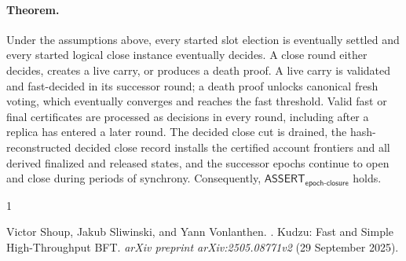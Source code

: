 \documentclass[sigplan,twocolumn,review,anonymous]{acmart}
\begin{document}
\paragraph{Theorem.}
Under the assumptions above, every started slot election is eventually settled and every started
logical close instance eventually decides.  A close round either decides, creates a live carry, or
produces a death proof.  A live carry is validated and fast-decided in its successor round; a death
proof unlocks canonical fresh voting, which eventually converges and reaches the fast threshold.
Valid fast or final certificates are processed as decisions in every round, including after a replica
has entered a later round.  The decided close cut is
drained, the hash-reconstructed decided close record installs the certified account frontiers and all
derived finalized and released states, and the successor epochs continue to open and close during
periods of synchrony.  Consequently,
\(\mathsf{ASSERT}_{\mathsf{epoch\mbox{-}closure}}\) holds.

\balance
\begin{thebibliography}{1}

Victor Shoup, Jakub Sliwinski, and Yann Vonlanthen.
.
\newblock Kudzu: Fast and Simple High-Throughput BFT.
\newblock \emph{arXiv preprint arXiv:2505.08771v2} (29 September 2025).

\end{thebibliography}
\end{document}
